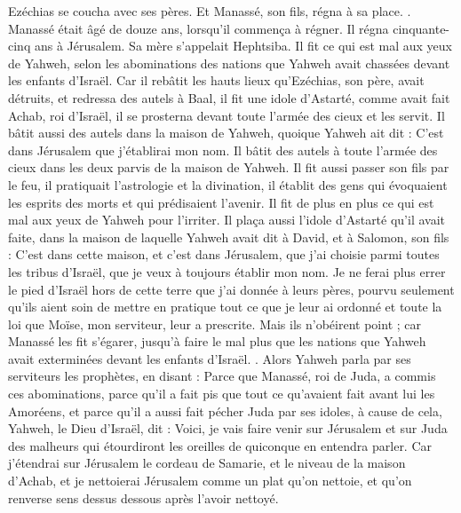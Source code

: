 \begin{multicols}{2}
Ezéchias se coucha avec ses pères. Et Manassé, son fils, régna à sa place.
.
\VerseOne{}Manassé était âgé de douze ans, lorsqu'il commença à régner. Il régna cinquante-cinq ans à Jérusalem. Sa mère s'appelait Hephtsiba.
Il fit ce qui est mal aux yeux de Yahweh, selon les abominations des nations que Yahweh avait chassées devant les enfants d'Israël.
Car il rebâtit les hauts lieux qu'Ezéchias, son père, avait détruits, et redressa des autels à Baal, il fit une idole d'Astarté, comme avait fait Achab, roi d'Israël, il se prosterna devant toute l'armée des cieux et les servit.
Il bâtit aussi des autels dans la maison de Yahweh, quoique Yahweh ait dit : C'est dans Jérusalem que j'établirai mon nom.
Il bâtit des autels à toute l'armée des cieux dans les deux parvis de la maison de Yahweh.
Il fit aussi passer son fils par le feu, il pratiquait l'astrologie et la divination, il établit des gens qui évoquaient les esprits des morts et qui prédisaient l'avenir. Il fit de plus en plus ce qui est mal aux yeux de Yahweh pour l'irriter.
Il plaça aussi l'idole d'Astarté qu'il avait faite, dans la maison de laquelle Yahweh avait dit à David, et à Salomon, son fils : C'est dans cette maison, et c'est dans Jérusalem, que j'ai choisie parmi toutes les tribus d'Israël, que je veux à toujours établir mon nom.
Je ne ferai plus errer le pied d'Israël hors de cette terre que j'ai donnée à leurs pères, pourvu seulement qu'ils aient soin de mettre en pratique tout ce que je leur ai ordonné et toute la loi que Moïse, mon serviteur, leur a prescrite.
Mais ils n'obéirent point ; car Manassé les fit s'égarer, jusqu'à faire le mal plus que les nations que Yahweh avait exterminées devant les enfants d'Israël.
.
Alors Yahweh parla par ses serviteurs les prophètes, en disant :
Parce que Manassé, roi de Juda, a commis ces abominations, parce qu'il a fait pis que tout ce qu'avaient fait avant lui les Amoréens, et parce qu'il a aussi fait pécher Juda par ses idoles,
à cause de cela, Yahweh, le Dieu d'Israël, dit : Voici, je vais faire venir sur Jérusalem et sur Juda des malheurs qui étourdiront les oreilles de quiconque en entendra parler.
Car j'étendrai sur Jérusalem le cordeau de Samarie, et le niveau de la maison d'Achab, et je nettoierai Jérusalem comme un plat qu'on nettoie, et qu'on renverse sens dessus dessous après l'avoir nettoyé.

\end{multicols}
